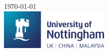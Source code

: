 \begin{titlepage}


{\large \today}\\[3cm] %


\includegraphics[width=0.4\textwidth]{figures/logo.png}\\[1.0cm] %
 

\vfill %

\end{titlepage}